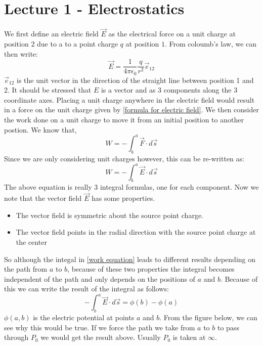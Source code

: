 \section{Lecture 1 - Electrostatics}
We first define an electric field $\vec{E}$ as the electrical force on a unit charge at position $2$ due to a to a point charge $q$ at position $1$. From coloumb's law, we can then write: 
\begin{equation}
	\label{formula for electric field}
	\vec{E} = \frac{1}{4\pi \epsilon_{0}} \frac{q}{r^{2}} \vec{e}_{12}
\end{equation}
$\vec{e}_{12}$ is the unit vector in the direction of the straight line between position 1 and 2. It should be stressed that $E$ is a vector and as 3 components along the 3 coordinate axes. Placing a unit charge anywhere in the electric field would result in a force on the unit charge given by \autoref{formula for electric field}. We then consider the work done on a unit charge to move it from an initial position to another postion. We know that, 
\begin{equation}
	W = -\int_{b}^{a} \vec{F} \cdot d\vec{s}
\end{equation}
Since we are only considering unit charges however, this can be re-written as: 
\begin{equation}
	\label{work equation}
	W = -\int_{b}^{a} \vec{E} \cdot d\vec{s}
\end{equation}
The above equation is really 3 integral formulas, one for each component. Now we note that the vector field $\vec{E}$ has some properties. 
\begin{itemize}
	\item The vector field is symmetric about the source point charge. 
	\item The vector field points in the radial direction with the source point charge at the center
\end{itemize}
So although the integal in \autoref{work equation} leads to different results depending on the path from $a$ to $b$, because of these two properties the integral becomes independent of the path and only depends on the positions of $a$ and $b$. Because of this we can write the result of the integral as follows: 
\begin{equation}
	-\int_{b}^{a} \vec{E} \cdot d\vec{s} = \phi(b) - \phi(a)
\end{equation}
$\phi(a, b)$ is the electric potential at points $a$ and $b$. From the figure below, we can see why this would be true. If we force the path we take from $a$ to $b$ to pass through $P_{0}$ we would get the result above. Usually $P_{0}$ is taken at $\infty$. 
